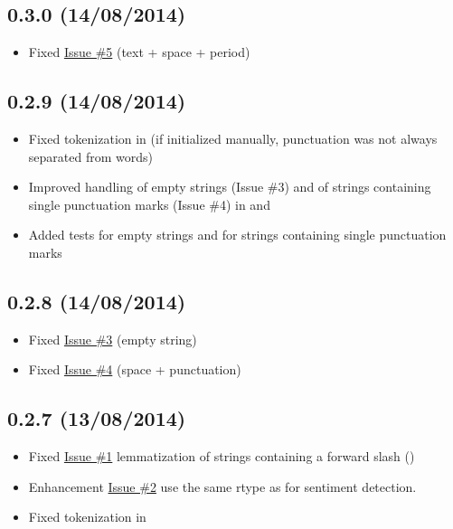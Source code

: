 \documentclass[letterpaper,10pt,english]{sphinxmanual}
\begin{document}
\subsection{0.3.0 (14/08/2014)}
\label{changelog:id3}\begin{itemize}
\item {} 
Fixed \href{https://github.com/markuskiller/textblob-de/issues/5}{Issue \#5} (text + space + period)

\end{itemize}


\subsection{0.2.9 (14/08/2014)}
\label{changelog:id4}\begin{itemize}
\item {} 
Fixed tokenization in  (if initialized manually, punctuation was not always separated from words)

\item {} 
Improved handling of empty strings (Issue \#3) and of strings containing single punctuation marks (Issue \#4) in  and 

\item {} 
Added tests for empty strings and for strings containing single punctuation marks

\end{itemize}


\subsection{0.2.8 (14/08/2014)}
\label{changelog:id5}\begin{itemize}
\item {} 
Fixed \href{https://github.com/markuskiller/textblob-de/issues/3}{Issue \#3} (empty string)

\item {} 
Fixed \href{https://github.com/markuskiller/textblob-de/issues/4}{Issue \#4} (space + punctuation)

\end{itemize}


\subsection{0.2.7 (13/08/2014)}
\label{changelog:id6}\begin{itemize}
\item {} 
Fixed \href{https://github.com/markuskiller/textblob-de/issues/1}{Issue \#1} lemmatization of strings containing a forward slash (\code{/})

\item {} 
Enhancement \href{https://github.com/markuskiller/textblob-de/issues/2}{Issue \#2} use the same rtype as  for sentiment detection.

\item {} 
Fixed tokenization in 

\end{itemize}
\end{document}
